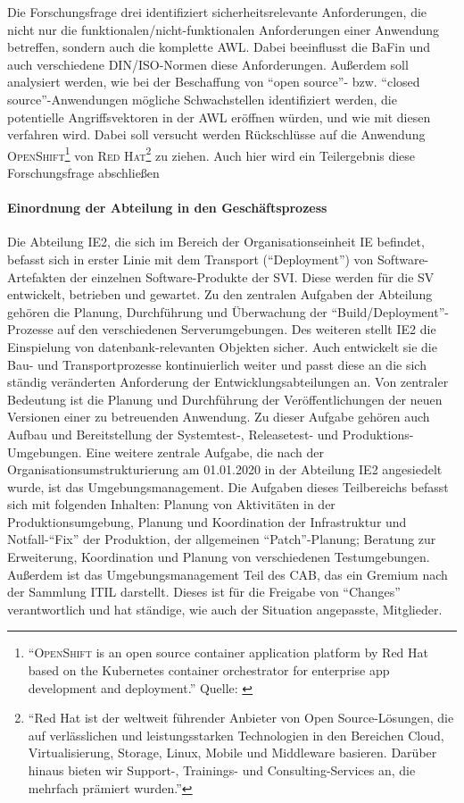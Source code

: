 Die Forschungsfrage drei identifiziert sicherheitsrelevante Anforderungen, die nicht nur die funktionalen/nicht-funktionalen Anforderungen einer Anwendung betreffen, sondern auch die komplette \ac{AWL}. Dabei beeinflusst die \ac{BaFin} und auch verschiedene \textsc{DIN/ISO}-Normen diese Anforderungen. Außerdem soll analysiert werden, wie bei der Beschaffung von \enquote{open source}- bzw. \enquote{closed source}-Anwendungen mögliche Schwachstellen identifiziert werden, die potentielle Angriffsvektoren in der \ac{AWL} eröffnen würden, und wie mit diesen verfahren wird. Dabei soll versucht werden Rückschlüsse auf die Anwendung \textsc{OpenShift\footnote{\enquote{\textsc{OpenShift} is an open source container application platform by Red Hat based on the Kubernetes container orchestrator for enterprise app development and deployment.} Quelle: \cite[][]{red_hat_inc_openshift_2020}}} von \textsc{Red Hat\footnote{\enquote{Red Hat ist der weltweit führender Anbieter von Open Source-Lösungen, die auf verlässlichen und leistungsstarken Technologien in den Bereichen Cloud, Virtualisierung, Storage, Linux, Mobile und Middleware basieren. Darüber hinaus bieten wir Support-, Trainings- und Consulting-Services an, die mehrfach prämiert wurden.}\cite[][]{red_hat_inc_red_2020}}} zu ziehen. Auch hier wird ein Teilergebnis diese Forschungsfrage abschließen


\paragraph{Einordnung der Abteilung in den Geschäftsprozess}
Die Abteilung \ac{IE2}, die sich im Bereich der Organisationseinheit \ac{IE} befindet, befasst sich in erster Linie mit dem Transport (\enquote{Deployment}) von Software-Artefakten der einzelnen Software-Produkte der \ac{SVI}. Diese werden für die \ac{SV} entwickelt, betrieben und gewartet. Zu den zentralen Aufgaben der Abteilung gehören die Planung, Durchführung und Überwachung der \enquote{Build/Deployment}-Prozesse auf den verschiedenen Serverumgebungen. Des weiteren stellt \ac{IE2} die Einspielung von datenbank-relevanten Objekten sicher. Auch entwickelt sie die Bau- und Transportprozesse kontinuierlich weiter und passt diese an die sich ständig veränderten Anforderung der Entwicklungsabteilungen an. Von zentraler Bedeutung ist die Planung und Durchführung der Veröffentlichungen der neuen Versionen einer zu betreuenden Anwendung. Zu dieser Aufgabe gehören auch Aufbau und Bereitstellung der Systemtest-, Releasetest- und Produktions-Umgebungen. Eine weitere zentrale Aufgabe, die nach der Organisationsumstrukturierung am 01.01.2020 in der Abteilung \ac{IE2} angesiedelt wurde, ist das Umgebungsmanagement. Die Aufgaben dieses Teilbereichs befasst sich mit folgenden Inhalten: Planung von Aktivitäten in der Produktionsumgebung, Planung und Koordination der Infrastruktur und Notfall-\enquote{Fix} der Produktion, der allgemeinen \enquote{Patch}-Planung; Beratung zur Erweiterung, Koordination und Planung von verschiedenen Testumgebungen. Außerdem ist das Umgebungsmanagement Teil des \ac{CAB}, das ein Gremium nach der Sammlung \ac{ITIL} darstellt. Dieses ist für die Freigabe von \enquote{Changes} verantwortlich und hat ständige, wie auch der Situation angepasste, Mitglieder. 

